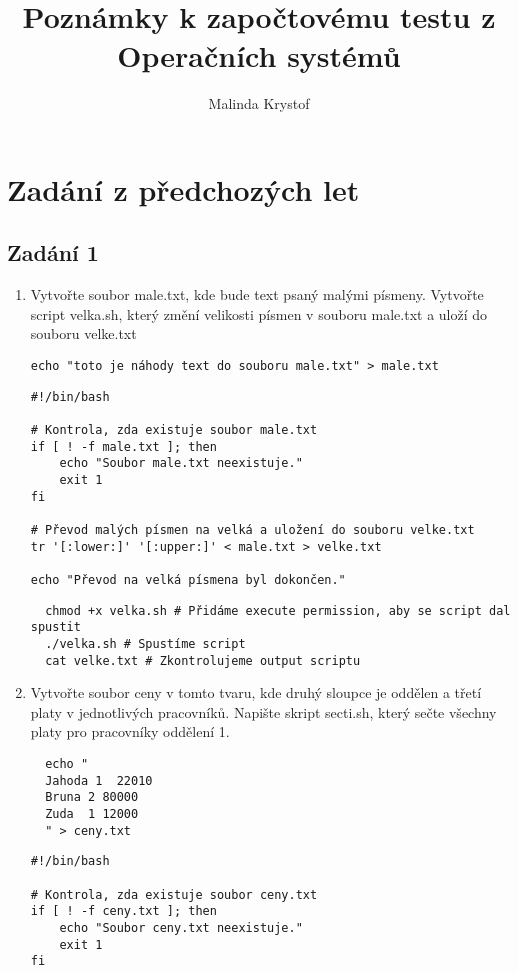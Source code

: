 \documentclass{article}
\title{Poznámky k započtovému testu z Operačních systémů}
\author{Malinda Krystof}
\begin{document}
\maketitle


\section{Zadání z předchozých let}
\subsection{Zadání 1}
\begin{enumerate}
  \item Vytvořte soubor male.txt, kde bude text psaný malými písmeny. Vytvořte script velka.sh, který změní velikosti písmen v souboru male.txt a uloží do souboru velke.txt
\begin{lstlisting}[caption=Vytvoříme soubor male.txt]
  echo "toto je náhody text do souboru male.txt" > male.txt
\end{lstlisting}
\begin{lstlisting}[caption=Jak by měl vypadat velka.sh]
#!/bin/bash

# Kontrola, zda existuje soubor male.txt
if [ ! -f male.txt ]; then
    echo "Soubor male.txt neexistuje."
    exit 1
fi

# Převod malých písmen na velká a uložení do souboru velke.txt
tr '[:lower:]' '[:upper:]' < male.txt > velke.txt

echo "Převod na velká písmena byl dokončen."
\end{lstlisting}
\begin{lstlisting}
  chmod +x velka.sh # Přidáme execute permission, aby se script dal spustit
  ./velka.sh # Spustíme script
  cat velke.txt # Zkontrolujeme output scriptu
\end{lstlisting}
  \item Vytvořte soubor ceny v tomto tvaru, kde druhý sloupce je oddělen a třetí platy v jednotlivých pracovníků. Napište skript secti.sh, který sečte všechny platy pro pracovníky oddělení 1.
\begin{lstlisting}
  echo "
  Jahoda 1  22010
  Bruna 2 80000
  Zuda  1 12000
  " > ceny.txt
\end{lstlisting}
\begin{lstlisting}[caption=skript secti.sh]
#!/bin/bash

# Kontrola, zda existuje soubor ceny.txt
if [ ! -f ceny.txt ]; then
    echo "Soubor ceny.txt neexistuje."
    exit 1
fi


\end{lstlisting}
\end{enumerate}
\end{document}
